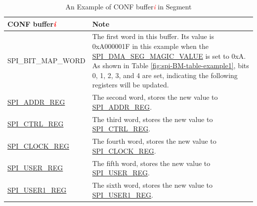 \documentclass[main\_\_EN.tex]{subfiles}
\begin{document}
\begin{longtable}[c]{|p{3.5cm}|p{10cm}| }
\caption{An Example of CONF buffer\textcolor{red}{\it i} in Segment  }
\label{fig:spi-BM-table-example2}\\\hline
\rowcolor{lightgray}
     \textbf{CONF buffer\textcolor{red}{\it i}} & \textbf{Note} \\\hline
     \centering\vfill SPI\_BIT\_MAP\_WORD\vfill & The first word in this buffer. Its value is 0xA000001F in this example when the \hyperref[fielddesc:SPIDMASEGMAGICVALUE]{SPI\_DMA\_SEG\_MAGIC\_VALUE} is set to 0xA. As shown in Table \ref{fig:spi-BM-table-example1}, bits 0, 1, 2, 3, and 4 are set, indicating the following registers will be updated. \\\hline
     
    \hyperref[regdesc:SPIADDRREG]{SPI\_ADDR\_REG} & The second word, stores the new value to \hyperref[regdesc:SPIADDRREG]{SPI\_ADDR\_REG}.       
     \\\hline
    \hyperref[regdesc:SPICTRLREG]{SPI\_CTRL\_REG} & The third word, stores the new value to \hyperref[regdesc:SPICTRLREG]{SPI\_CTRL\_REG}.      
     \\\hline
    \hyperref[regdesc:SPICLOCKREG]{SPI\_CLOCK\_REG} & The fourth word, stores the new value to \hyperref[regdesc:SPICLOCKREG]{SPI\_CLOCK\_REG}.     
     \\\hline
    \hyperref[regdesc:SPIUSERREG]{SPI\_USER\_REG} &The fifth word, stores the new value to \hyperref[regdesc:SPIUSERREG]{SPI\_USER\_REG}. 
     \\\hline
    \hyperref[regdesc:SPIUSER1REG]{SPI\_USER1\_REG} &The sixth word, stores the new value to \hyperref[regdesc:SPIUSER1REG]{SPI\_USER1\_REG}.
     \\\hline
\end{longtable} 
\end{document}
